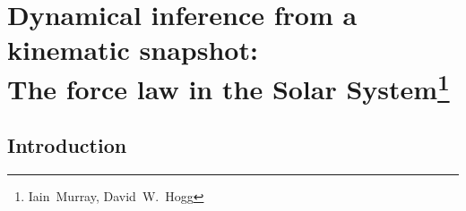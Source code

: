 
\chapter[Dynamical inference from a kinematic snapshot: The force law in the Solar System]{Dynamical inference from a kinematic snapshot:\\
  The force law in the Solar System\protect\footnote{Iain~Murray, David~W.~Hogg}\label{chap:solarsystem}}


\section{Introduction}

